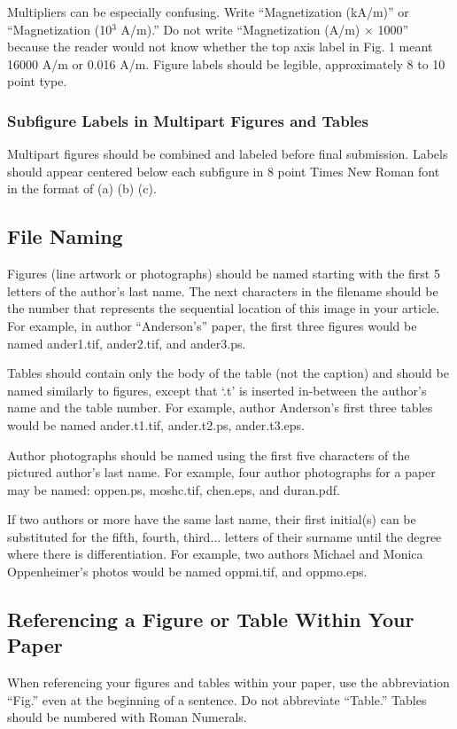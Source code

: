 \documentclass[journal,onecolumn,web]{ieeecolor}
\begin{document}
Multipliers can be especially confusing. Write ``Magnetization (kA/m)'' or 
``Magnetization (10$^{3}$ A/m).'' Do not write ``Magnetization 
(A/m)$\,\times\,$1000'' because the reader would not know whether the top 
axis label in Fig. 1 meant 16000 A/m or 0.016 A/m. Figure labels should be 
legible, approximately 8 to 10 point type.

\subsubsection{Subfigure Labels in Multipart Figures and Tables}
Multipart figures should be combined and labeled before final submission. 
Labels should appear centered below each subfigure in 8 point Times New 
Roman font in the format of (a) (b) (c). 

\subsection{File Naming}
Figures (line artwork or photographs) should be named starting with the 
first 5 letters of the author's last name. The next characters in the 
filename should be the number that represents the sequential 
location of this image in your article. For example, in author 
``Anderson's'' paper, the first three figures would be named ander1.tif, 
ander2.tif, and ander3.ps.

Tables should contain only the body of the table (not the caption) and 
should be named similarly to figures, except that `.t' is inserted 
in-between the author's name and the table number. For example, author 
Anderson's first three tables would be named ander.t1.tif, ander.t2.ps, 
ander.t3.eps.

Author photographs should be named using the first five characters of the 
pictured author's last name. For example, four author photographs for a 
paper may be named: oppen.ps, moshc.tif, chen.eps, and duran.pdf.

If two authors or more have the same last name, their first initial(s) can 
be substituted for the fifth, fourth, third$\ldots$ letters of their surname 
until the degree where there is differentiation. For example, two authors 
Michael and Monica Oppenheimer's photos would be named oppmi.tif, and 
oppmo.eps.

\subsection{Referencing a Figure or Table Within Your Paper}
When referencing your figures and tables within your paper, use the 
abbreviation ``Fig.'' even at the beginning of a sentence. Do not abbreviate 
``Table.'' Tables should be numbered with Roman Numerals.
\end{document}
